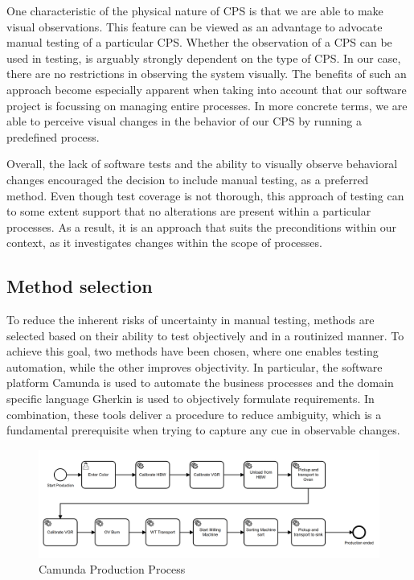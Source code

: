 One characteristic of the physical nature of CPS is that we are able to make visual observations. This feature can be viewed as an advantage to advocate manual testing of a particular CPS. Whether the observation of a CPS can be used in testing, is arguably strongly dependent on the type of CPS. In our case, there are no restrictions in observing the system visually. The benefits of such an approach become especially apparent when taking into account that our software project is focussing on managing entire processes. In more concrete terms, we are able to perceive visual changes in the behavior of our CPS by running a predefined process.  

Overall, the lack of software tests and the ability to visually observe behavioral changes encouraged the decision to include manual testing,  as a preferred method. Even though test coverage is not thorough, this approach of testing can to some extent support that no alterations are present within a particular processes. As a result, it is an approach that suits the preconditions within our context, as it investigates changes within the scope of processes.

\subsection{Method selection}

To reduce the inherent risks of uncertainty in manual testing, methods are selected based on their ability to test objectively and in a routinized manner. To achieve this goal, two methods have been chosen, where one enables testing automation, while the other improves objectivity. In particular, the software platform Camunda is used to automate the business processes and the domain specific language Gherkin is used to objectively formulate requirements. In combination, these tools deliver a procedure to reduce ambiguity, which is a fundamental prerequisite when trying to capture any cue in observable changes.

\begin{figure}[htp]
    \centering
    \includegraphics[width=\textwidth]{./assets/camunda_process}
    \caption{Camunda Production Process}
\end{figure}

